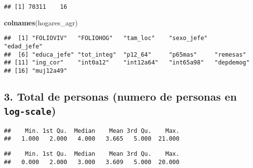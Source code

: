 \documentclass[11pt,]{article}
\newenvironment{Shaded}{\begin{snugshade}}{\end{snugshade}}
\newcommand{\KeywordTok}[1]{\textcolor[rgb]{0.13,0.29,0.53}{\textbf{#1}}}
\newcommand{\StringTok}[1]{\textcolor[rgb]{0.31,0.60,0.02}{#1}}
\newcommand{\CommentTok}[1]{\textcolor[rgb]{0.56,0.35,0.01}{\textit{#1}}}
\newcommand{\OperatorTok}[1]{\textcolor[rgb]{0.81,0.36,0.00}{\textbf{#1}}}
\newcommand{\NormalTok}[1]{#1}
\begin{document}
\begin{verbatim}
## [1] 70311    16
\end{verbatim}

\begin{Shaded}
\begin{Highlighting}[]
\KeywordTok{colnames}\NormalTok{(hogares_agr)}
\end{Highlighting}
\end{Shaded}

\begin{verbatim}
##  [1] "FOLIOVIV"   "FOLIOHOG"   "tam_loc"    "sexo_jefe"  "edad_jefe" 
##  [6] "educa_jefe" "tot_integ"  "p12_64"     "p65mas"     "remesas"   
## [11] "ing_cor"    "int0a12"    "int12a64"   "int65a98"   "depdemog"  
## [16] "muj12a49"
\end{verbatim}

\subsection{\texorpdfstring{3. Total de personas (numero de personas en
\texttt{log-scale})}{3. Total de personas (numero de personas en log-scale)}}\label{total-de-personas-numero-de-personas-en-log-scale}

\begin{Shaded}
\end{Shaded}

\begin{verbatim}
##    Min. 1st Qu.  Median    Mean 3rd Qu.    Max. 
##   1.000   2.000   4.000   3.665   5.000  21.000
\end{verbatim}

\begin{Shaded}
\end{Shaded}

\begin{verbatim}
##    Min. 1st Qu.  Median    Mean 3rd Qu.    Max. 
##   0.000   2.000   3.000   3.609   5.000  20.000
\end{verbatim}
\end{document}
